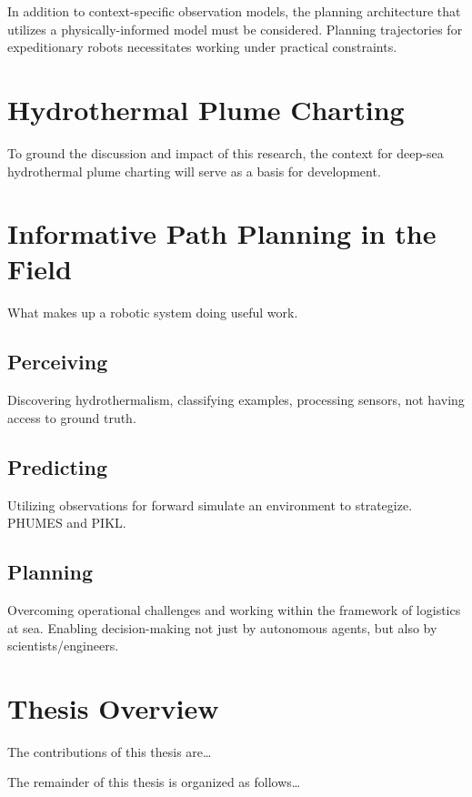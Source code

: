 In addition to context-specific observation models, the planning architecture that utilizes a physically-informed model must be considered.
Planning trajectories for expeditionary robots necessitates working under practical constraints.





\section{Hydrothermal Plume Charting}
To ground the discussion and impact of this research, the context for deep-sea hydrothermal plume charting will serve as a basis for development.

\section{Informative Path Planning in the Field}
What makes up a robotic system doing useful work.

\subsection{Perceiving}
Discovering hydrothermalism, classifying examples, processing sensors, not having access to ground truth.

\subsection{Predicting}
Utilizing observations for forward simulate an environment to strategize. PHUMES and PIKL.

\subsection{Planning}
Overcoming operational challenges and working within the framework of logistics at sea. Enabling decision-making not just by autonomous agents, but also by scientists/engineers.

\section{Thesis Overview}
The contributions of this thesis are\dots

The remainder of this thesis is organized as follows\dots